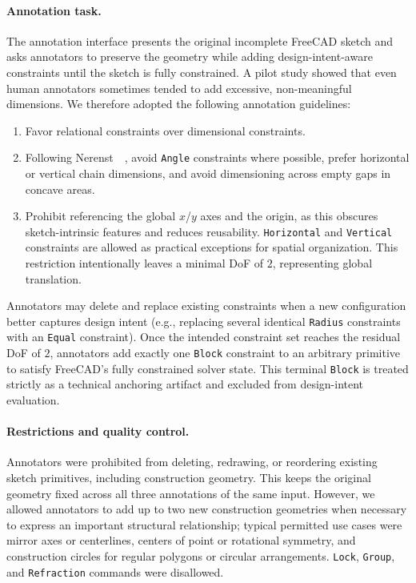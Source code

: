 \paragraph{Annotation task.}
The annotation interface presents the original incomplete FreeCAD sketch and asks annotators to preserve the geometry while adding design-intent-aware constraints until the sketch is fully constrained. A pilot study showed that even human annotators sometimes tended to add excessive, non-meaningful dimensions. We therefore adopted the following annotation guidelines:
\begin{enumerate}[leftmargin=*, itemsep=1pt, topsep=2pt]
    \item Favor relational constraints over dimensional constraints.
    \item Following Nerenst~\etal~\cite{nerenst2023parametric}, avoid \texttt{Angle} constraints where possible, prefer horizontal or vertical chain dimensions, and avoid dimensioning across empty gaps in concave areas.
    \item Prohibit referencing the global $x$/$y$ axes and the origin, as this obscures sketch-intrinsic features and reduces reusability. \texttt{Horizontal} and \texttt{Vertical} constraints are allowed as practical exceptions for spatial organization. This restriction intentionally leaves a minimal DoF of $2$, representing global translation.
\end{enumerate}
Annotators may delete and replace existing constraints when a new configuration better captures design intent (e.g., replacing several identical \texttt{Radius} constraints with an \texttt{Equal} constraint). Once the intended constraint set reaches the residual DoF of $2$, annotators add exactly one \texttt{Block} constraint to an arbitrary primitive to satisfy FreeCAD's fully constrained solver state. This terminal \texttt{Block} is treated strictly as a technical anchoring artifact and excluded from design-intent evaluation.

\paragraph{Restrictions and quality control.}
Annotators were prohibited from deleting, redrawing, or reordering existing sketch primitives, including construction geometry. This keeps the original geometry fixed across all three annotations of the same input. However, we allowed annotators to add up to two new construction geometries when necessary to express an important structural relationship; typical permitted use cases were mirror axes or centerlines, centers of point or rotational symmetry, and construction circles for regular polygons or circular arrangements. \texttt{Lock}, \texttt{Group}, and \texttt{Refraction} commands were disallowed.


